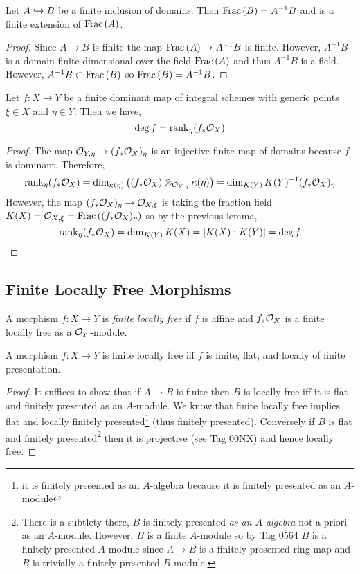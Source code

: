 \documentclass[12pt]{article}
\begin{document}
\begin{lemma}
Let $A \hookrightarrow B$ be a finite inclusion of domains. Then $\mathrm{Frac}\left(B\right) = A^{-1} B$ and is a finite extension of $\mathrm{Frac}\left(A\right)$.
\end{lemma}

\begin{proof}
Since $A \to B$ is finite the map $\mathrm{Frac}\left(A\right) \to A^{-1} B$ is finite. However, $A^{-1} B$ is a domain finite dimensional over the field $\mathrm{Frac}\left(A\right)$ and thus $A^{-1} B$ is a field. However, $A^{-1} B \subset \mathrm{Frac}\left(B\right)$ so $\mathrm{Frac}\left(B\right) = A^{-1} B$.
\end{proof}

\begin{prop}
Let $f : X \to Y$ be a finite dominant map of integral schemes with generic points $\xi \in X$ and $\eta \in Y$. Then we have,
\[ \deg{f} = \operatorname{\mathrm{rank}}_{\eta}(f_* \mathcal{O}_{X}) \] 
\end{prop}

\begin{proof}
The map $\mathcal{O}_{Y, \eta} \to (f_* \mathcal{O}_{X})_\eta$ is an injective finite map of domains because $f$ is dominant. Therefore, 
\[ \operatorname{\mathrm{rank}}_\eta(f_* \mathcal{O}_{X}) = \dim_{\kappa(\eta)} \left( (f_* \mathcal{O}_{X}) \otimes_{\mathcal{O}_{Y, \eta}} \kappa(\eta) \right) = \dim_{K(Y)} K(Y)^{-1} (f_* \mathcal{O}_{X})_\eta \]
However, the map $(f_* \mathcal{O}_{X})_\eta \to \mathcal{O}_{X, \xi}$ is taking the fraction field $K(X) = \mathcal{O}_{X, \xi} = \mathrm{Frac}\left((f_* \mathcal{O}_{X})_\eta\right)$ so by the previous lemma,
\[ \operatorname{\mathrm{rank}}_{\eta}(f_* \mathcal{O}_{X}) = \dim_{K(Y)} K(X) = [ K(X) : K(Y)] = \deg{f} \]
\end{proof}

\subsection{Finite Locally Free Morphisms}

\begin{defn}
A morphism $f : X \to Y$ is \textit{finite locally free} if $f$ is affine and $f_* \mathcal{O}_{X}$ is a finite locally free as a $\mathcal{O}_{Y}$-module.
\end{defn}

\begin{prop}
A morphism $f : X \to Y$ is finite locally free iff $f$ is finite, flat, and locally of finite presentation.
\end{prop}

\begin{proof}
It suffices to show that if $A \to B$ is finite then $B$ is locally free iff it is flat and finitely presented as an $A$-module. We know that finite locally free implies flat and locally finitely presented\footnote{it is finitely presented as an $A$-algebra because it is finitely presented as an $A$-module } (thus finitely presented). Conversely if $B$ is flat and finitely presented\footnote{There is a subtlety there, $B$ is finitely presented \textit{as an $A$-algebra} not a priori as an $A$-module. However, $B$ is a finite $A$-module so by Tag 0564 $B$ is a finitely presented $A$-module since $A \to B$ is a finitely presented ring map and $B$ is trivially a finitely presented $B$-module.} then it is projective (see Tag 00NX) and hence locally free. 
\end{proof}
\end{document}
